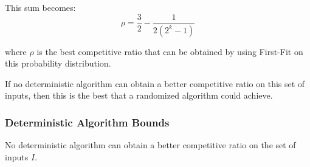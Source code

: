 This sum becomes:
\begin{equation*}
\rho = \frac{3}{2} - \frac{1}{2(2^k-1)}
\end{equation*}

where $\rho$ is the best competitive ratio that can be obtained by using First-Fit on this probability distribution. 

If no deterministic algorithm can obtain a better competitive ratio on this set of inputs, then this is the best that a randomized algorithm could achieve.
\subsubsection{Deterministic Algorithm Bounds}
\begin{theorem}
	No deterministic algorithm can obtain a better competitive ratio on the set of inputs $I$.
\end{theorem}
